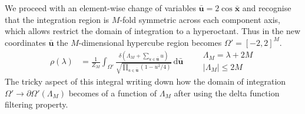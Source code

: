 \documentclass{article}[12pt]
\numberwithin{equation}{section}
\begin{document}
We proceed with an element-wise change of variables $\mathbf{\bar u}=2\cos \mathbf{\bar x}$ and
recognise that the integration region is $M$-fold symmetric across each
component axis, which allows restrict the domain of integration to a
hyperoctant. Thus in the new coordinates $\mathbf{\bar u}$ the
$M$-dimensional hypercube region becomes $\Omega'=[-2,2]^M$.
\begin{align*}
  \rho(\lambda)&=\frac{1}{Z_M}
  \int_{\Omega'}\!
  \frac{\delta(\Lambda_M+\sum_{u\in\mathbf{\bar u}}u)}
  {\sqrt{\prod_{u\in\mathbf{\bar u}}(1-u^2/4) }}
  \,\mathrm{d}\mathbf{\bar u}
  \qquad
  \begin{matrix}
    \Lambda_M=\lambda+2M \\
    |\Lambda_M|\leq2M
  \end{matrix}
\end{align*}
The tricky aspect of this integral writing down how the domain of integration
$\Omega'\rightarrow\partial\Omega'(\Lambda_M)$ becomes of a function of $\Lambda_M$
after using the delta function filtering property.
\end{document}

